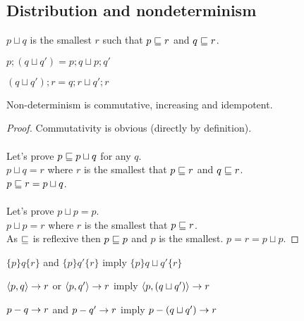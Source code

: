 \documentclass{article}
\begin{document}
\subsection*{Distribution and nondeterminism}

\begin{definition}[$\sqcup$]
$p \sqcup q$ is the smallest $r$ such that $p \sqsubseteq r$ and $q \sqsubseteq r$.
\end{definition}

\begin{law}
$p; (q \sqcup q') = p; q \sqcup p; q'$
\end{law}

\begin{law}
$(q \sqcup q'); r = q; r \sqcup q'; r$
\end{law}

\begin{theorem}
Non-determinism is commutative, increasing and idempotent.
\end{theorem}

\begin{proof}
Commutativity is obvious (directly by definition).\\
\\
Let's prove $p \sqsubseteq p \sqcup q$ for any $q$.\\
$p \sqcup q = r$ where $r$ is the smallest that $p \sqsubseteq r$ and $q \sqsubseteq r$.\\
$p \sqsubseteq r = p \sqcup q$.\\
\\
Let's prove $p \sqcup p = p$.\\
$p \sqcup p = r$ where $r$ is the smallest that $p \sqsubseteq r$.\\
As $\sqsubseteq$ is reflexive then $p \sqsubseteq p$ and $p$ is the smallest.
$p = r = p \sqcup p$.
\end{proof}

\begin{rul}
$\{p\}q\{r\}$ and $\{p\}q'\{r\}$ imply $\{p\} q \sqcup q' \{r\}$
\end{rul}

\begin{rul}
$\left< p, q \right> \rightarrow r$ or $\left< p, q' \right> \rightarrow r$ imply $\left< p, (q \sqcup q') \right> \rightarrow r$
\end{rul}

\begin{rul}
$p-q\rightarrow r$ and $p-q'\rightarrow r$ imply $p-(q \sqcup q')\rightarrow r$
\end{rul}
\end{document}
